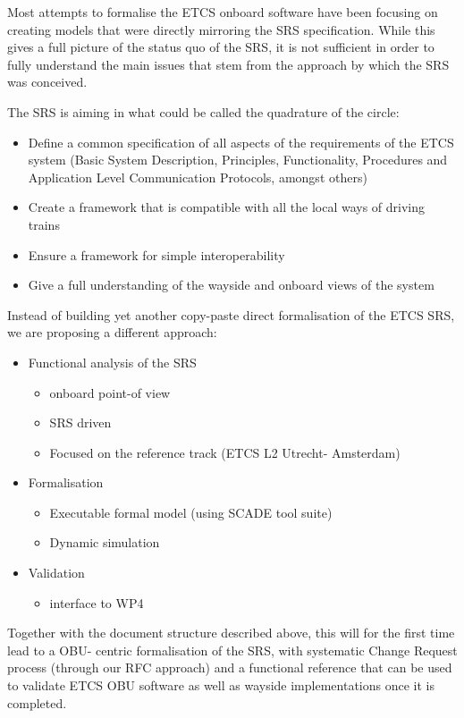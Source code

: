 Most attempts to formalise the ETCS onboard software have been focusing on creating models that were directly mirroring the SRS specification.
While this gives a full picture of the status quo of the SRS, it is not sufficient in order to fully understand the main issues that stem from the approach by which the SRS was conceived.

The SRS is aiming in what could be called the quadrature of the circle:
\begin{itemize}
\item Define a common specification of all aspects of the requirements of the ETCS system (Basic System Description, Principles, Functionality, Procedures and Application Level Communication Protocols, amongst others)
\item Create a framework that is compatible with all the local ways of driving trains
\item Ensure a framework for simple interoperability 
\item Give a full understanding of the wayside and onboard views of the system
\end {itemize}

Instead of building yet another copy-paste direct formalisation of the ETCS SRS, we are proposing a different approach:
\begin{itemize}
\item Functional analysis of the SRS
  \begin{itemize}
  \item onboard point-of view
  \item SRS driven
  \item  Focused on the reference track (ETCS L2 Utrecht- Amsterdam)
  \end{itemize}
\item Formalisation
  \begin{itemize}
  \item Executable formal model (using SCADE tool suite)
  \item Dynamic simulation 
  \end{itemize}
\item Validation
  \begin{itemize}
  \item interface to WP4
  \end{itemize}
\end{itemize}

Together with the document structure described above, this will for the first time lead to a OBU- centric formalisation of the SRS, with systematic Change Request process (through our RFC approach) and a functional reference that can be used to validate ETCS OBU software as well as wayside implementations once it is completed.

